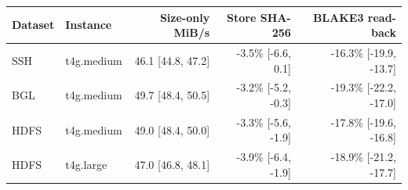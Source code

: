 
\begin{tabular}{@{}llrrr@{}}
\toprule
Dataset & Instance & Size-only MiB/s & Store SHA-256 & BLAKE3 read-back \\
\midrule
SSH & t4g.medium & 46.1 [44.8, 47.2] & -3.5\% [-6.6, 0.1] & -16.3\% [-19.9, -13.7] \\
BGL & t4g.medium & 49.7 [48.4, 50.5] & -3.2\% [-5.2, -0.3] & -19.3\% [-22.2, -17.0] \\
HDFS & t4g.medium & 49.0 [48.4, 50.0] & -3.3\% [-5.6, -1.9] & -17.8\% [-19.6, -16.8] \\
HDFS & t4g.large & 47.0 [46.8, 48.1] & -3.9\% [-6.4, -1.9] & -18.9\% [-21.2, -17.7] \\
\bottomrule
\end{tabular}
